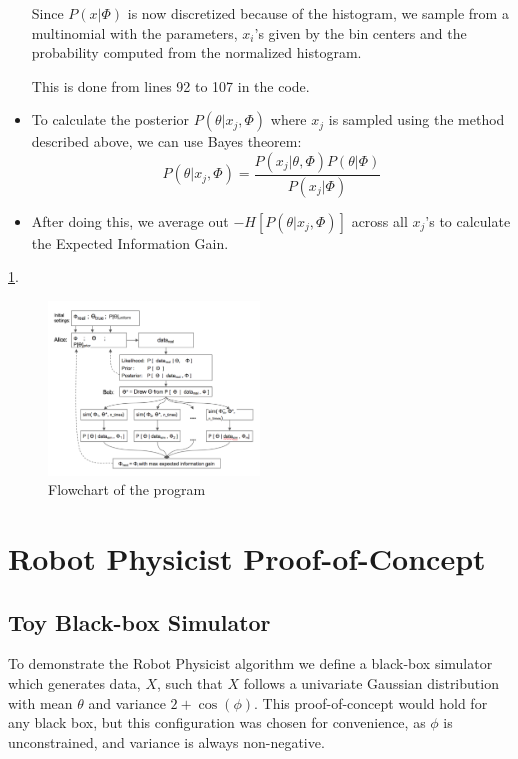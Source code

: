 \documentclass[10pt,journal,compsoc]{IEEEtran}
\begin{document}
\begin{itemize}
Since $P(x | \Phi)$ is now discretized because of the histogram, we sample from a multinomial with the parameters, $x_i$'s given by the bin centers and the probability computed from the normalized histogram.

This is done from lines 92 to 107 in the code.

\item To calculate the posterior $P(\theta|x_j,\Phi)$ where $x_j$ is sampled using the method described above, we can use Bayes theorem:
\begin{equation}
P(\theta|x_j,\Phi)=\frac{P(x_j|\theta,\Phi)P(\theta|\Phi)}{P(x_j|\Phi)}
\end{equation}

\item After doing this, we average out $-H[P(\theta|x_j ,\Phi)]$ across all $x_j$'s to calculate the Expected Information Gain.
\end{itemize}

\ref{fig:flowchart}.
\begin{figure}[ht!]
 \centering
  \includegraphics[width=0.5\textwidth]{images/flowchart.png}
  \caption{\label{fig:flowchart} Flowchart of the program}
\end{figure}

\section{Robot Physicist Proof-of-Concept}

\subsection{Toy Black-box Simulator}
To demonstrate the Robot Physicist algorithm we define a black-box simulator which generates data, $X$, such that $X$ follows a univariate Gaussian distribution with mean $\theta$ and variance $2 + \cos(\phi)$. This proof-of-concept would hold for any black box, but  this configuration was chosen for convenience, as $\phi$ is unconstrained, and variance is always non-negative. 
\end{document}
